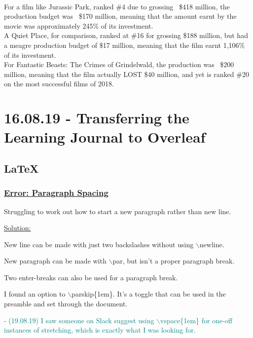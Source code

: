 \documentclass[12pt]{article}
\begin{document}
\begin{enumerate}
    \vspace{0.5em}
    \\For a film like Jurassic Park, ranked \#4 due to grossing ~\$418 million, the production budget was ~\$170 million, meaning that the amount earnt by the movie was approximately 245\% of its investment. 
    \vspace{0.5em}
    \\A Quiet Place, for comparison, ranked at \#16 for grossing \$188 million, but had a meagre production budget of \$17 million, meaning that the film earnt 1,106\% of its investment.
    \vspace{0.5em}
    \\For Fantastic Beasts: The Crimes of Grindelwald, the production was ~\$200 million, meaning that the film actually LOST \$40 million, and yet is ranked \#20 on the most successful films of 2018. 
\end{enumerate}

\newpage\section{16.08.19 - Transferring the Learning Journal to Overleaf}

\subsection{LaTeX}
\subsubsection{\texorpdfstring{\underline{Error: Paragraph Spacing}}{}}\label{error:er6}
\begin{addmargin}[1cm]{0cm}
Struggling to work out how to start a new paragraph rather than new line. 

\underline{Solution:}

New line can be made with just two backslashes without using $\backslash$newline.

New paragraph can be made with $\backslash$par, but isn't a proper paragraph break.

Two enter-breaks can also be used for a paragraph break.

I found an option to $\backslash$parskip\{1em\}. It's a toggle that can be used in the preamble and set through the document.

\textcolor{teal}{- (19.08.19) I saw someone on Slack suggest using $\backslash$vspace\{1em\} for one-off instances of stretching, which is exactly what I was looking for.}


\end{addmargin}
\end{document}
